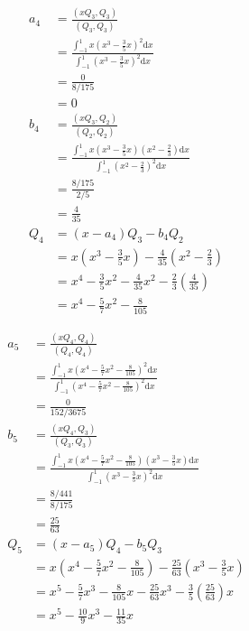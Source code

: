 {\[
\begin{aligned}
a_4 &= \frac{(x Q_3, Q_3)}{(Q_3, Q_3)}\\
    &= \frac{\int_{-1}^1 x (x^3 - \frac{3}{5} x)^2 \textrm{d}x}{
    \int_{-1}^1 (x^3 - \frac{3}{5} x)^2 \textrm{d}x} \\
    &= \frac{0}{8/175} \\
    &= 0 \\
b_4 &= \frac{(x Q_3, Q_2)}{(Q_2, Q_2)} \\
    &= \frac{\int_{-1}^1 x (x^3 - \frac{3}{5} x) (x^2 - \frac{2}{3}) \textrm{d}x}{\int_{-1}^1 (x^2 - \frac{2}{3})^2 \textrm{d}x} \\
    &= \frac{8/175}{2/5} \\
    &= \frac{4}{35} \\
Q_4 &= (x- a_4) Q_3 - b_4 Q_2 \\
    &= x (x^3 - \frac{3}{5} x) - \frac{4}{35} (x^2 - \frac{2}{3}) \\
    &= x^4 - \frac{3}{5} x^2 - \frac{4}{35} x^2 - \frac{2}{3}
    (\frac{4}{35}) \\
    &= x^4 - \frac{5}{7} x^2 - \frac{8}{105}
\end{aligned}
\]

\[
\begin{aligned}
a_5 &= \frac{(x Q_4, Q_4)}{(Q_4, Q_4)}\\
    &= \frac{\int_{-1}^1 x (x^4 - \frac{5}{7} x^2
    - \frac{8}{105})^2 \textrm{d}x}{\int_{-1}^1 (x^4 - \frac{5}{ 7}
    x^2 - \frac{8}{105})^2 \textrm{d}x}  \\
    &= \frac{0}{152/3675} \\
b_5 &= \frac{(x Q_4, Q_3)}{(Q_3, Q_3)} \\
    &= \frac{\int_{-1}^1 x (x^4 - \frac{5}{7} x^2 - \frac{8}{105})(x^3
    - \frac{3}{5} x) \textrm{d}x}{\int_{-1}^1 (x^3 - \frac{3}{5}
    x)^2 \textrm{d}x}\\
    &= \frac{8/441}{8/175} \\
    &= \frac{25}{63} \\
Q_5 &= (x - a_5) Q_4 - b_5 Q_3 \\
    &= x (x^4 - \frac{5}{7} x^2 - \frac{8}{105}) - \frac{25}{63} (x^3
    - \frac{3}{5} x) \\
    &= x^5 - \frac{5}{7} x^3 - \frac{8}{105} x - \frac{25}{63} x^3
    - \frac{3}{5} (\frac{25}{63}) x \\
    &= x^5 - \frac{10}{9} x^3 - \frac{11}{35} x
\end{aligned}
\]

}
